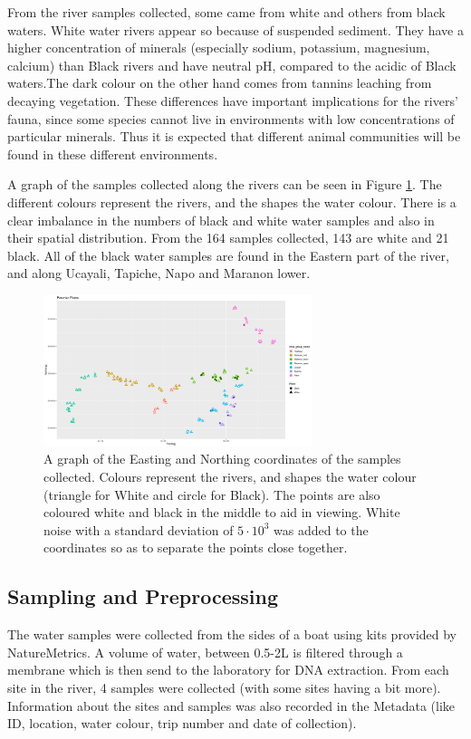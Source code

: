 From the river samples collected, some came from white and others from black waters. White water rivers appear so because of suspended  sediment. They have a higher concentration of minerals (especially sodium, potassium, magnesium, calcium) than Black rivers and have neutral pH, compared to the acidic of Black waters.The dark colour on the other hand comes from tannins leaching from decaying vegetation. These differences have important implications for the rivers' fauna, since some species cannot live in  environments with low concentrations of particular minerals. Thus it is expected that different animal communities will be found in these different environments. 

A graph of the samples collected along the rivers can be seen in Figure \ref{fig:graphmap}. The different colours represent the rivers, and the shapes the water colour. There is a clear imbalance in the numbers of black and white water samples and also in their spatial distribution. From the 164 samples collected, 143 are white and 21 black. All of the black water samples are found in the Eastern part of the river, and along Ucayali, Tapiche, Napo and Maranon lower. 

\begin{figure}
	\centering
	\includegraphics[width=0.7\textwidth]{mapofrivers}
	\caption{A graph of the Easting and Northing coordinates of the samples collected. Colours represent the rivers, and shapes the water colour (triangle for White and circle for Black). The points are also coloured white and black in the middle to aid in viewing. White noise with a standard deviation of $5 \cdot 10^3$ was added to the coordinates so as to separate the points close together.}
	\label{fig:graphmap}
\end{figure}
\subsection{Sampling and Preprocessing}
The water samples were collected from the sides of a boat using kits provided by NatureMetrics. A volume of water, between 0.5-2L is filtered through a membrane which is then send to the laboratory for DNA extraction. From each site in the river, 4 samples were collected (with some sites having a bit more). Information about the sites and samples was also recorded in the Metadata (like ID, location, water colour, trip number and date of collection). 

